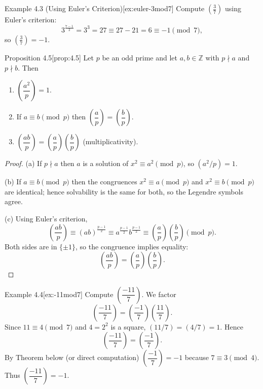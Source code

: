 \documentclass[10pt]{article}
\theoremstyle{definition}
\theoremstyle{plain}
\numberwithin{equation}{section}
\begin{document}
\begin{define}{Example 4.3 (Using Euler's Criterion)}[ex:euler-3mod7]
Compute $\left(\frac{3}{7}\right)$ using Euler's criterion:
\[
3^{\frac{7-1}{2}}=3^3=27\equiv 27-21=6\equiv -1\pmod 7,
\]
so $\left(\frac{3}{7}\right)=-1$.
\end{define}

\bigskip

\begin{define}{Proposition 4.5}[prop:4.5]
Let $p$ be an odd prime and let $a,b\in\mathbb{Z}$ with $p\nmid a$ and $p\nmid b$. Then
\begin{enumerate}
  \item $\left(\dfrac{a^2}{p}\right)=1$.
  \item If $a\equiv b\pmod p$ then $\left(\dfrac{a}{p}\right)=\left(\dfrac{b}{p}\right)$.
  \item $\left(\dfrac{ab}{p}\right)=\left(\dfrac{a}{p}\right)\left(\dfrac{b}{p}\right)$ (multiplicativity).
\end{enumerate}
\end{define}

\begin{proof}
(a) If $p\nmid a$ then $a$ is a solution of $x^2\equiv a^2\pmod p$, so $(a^2/p)=1$.

(b) If $a\equiv b\pmod p$ then the congruences $x^2\equiv a\pmod p$ and $x^2\equiv b\pmod p$ are identical; hence solvability is the same for both, so the Legendre symbols agree.

(c) Using Euler's criterion,
\[
\left(\frac{ab}{p}\right) \equiv (ab)^{\frac{p-1}{2}} \equiv a^{\frac{p-1}{2}} b^{\frac{p-1}{2}} \equiv
\left(\frac{a}{p}\right)\left(\frac{b}{p}\right)\pmod p.
\]
Both sides are in $\{\pm1\}$, so the congruence implies equality:
\[
\left(\frac{ab}{p}\right)=\left(\frac{a}{p}\right)\left(\frac{b}{p}\right).
\]
\end{proof}

\begin{define}{Example 4.4}[ex:-11mod7]
Compute $\left(\dfrac{-11}{7}\right)$. We factor
\[
\left(\frac{-11}{7}\right)=\left(\frac{-1}{7}\right)\left(\frac{11}{7}\right).
\]
Since $11\equiv 4\pmod 7$ and $4=2^2$ is a square, $(11/7)=(4/7)=1$. Hence
\[
\left(\frac{-11}{7}\right)=\left(\frac{-1}{7}\right).
\]
By Theorem  below (or direct computation) $\left(\dfrac{-1}{7}\right)=-1$ because $7\equiv 3\pmod 4$. Thus $\left(\dfrac{-11}{7}\right)=-1$.
\end{define}

\bigskip
\end{document}
